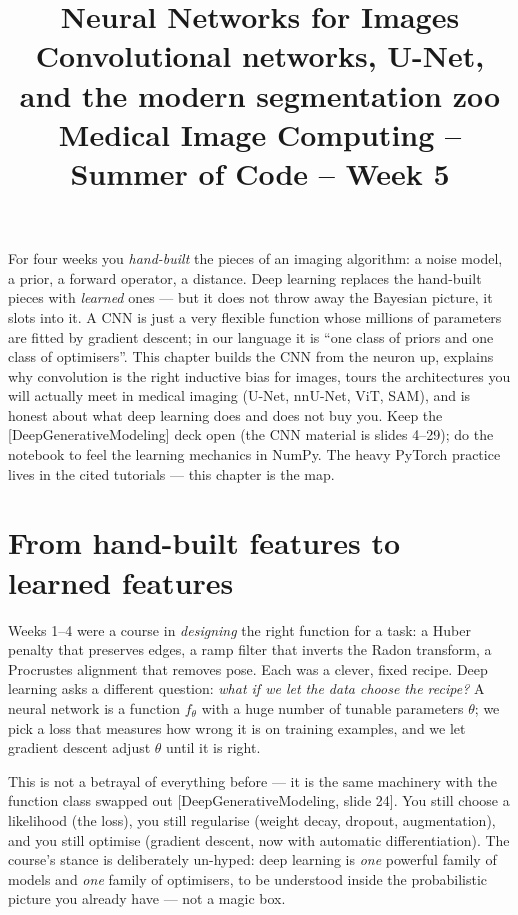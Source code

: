 \documentclass[11pt]{article}
\title{\textbf{Neural Networks for Images}\\[2pt]
\large Convolutional networks, U-Net, and the modern segmentation zoo\\[6pt]
\normalsize Medical Image Computing -- Summer of Code -- Week 5}
\author{}
\date{}
\newcommand{\deck}[1]{\textsf{\small[#1]}}
\begin{document}
\maketitle
\vspace{-2.2em}

\begin{keybox}
For four weeks you \emph{hand-built} the pieces of an imaging algorithm: a noise
model, a prior, a forward operator, a distance. Deep learning replaces the
hand-built pieces with \emph{learned} ones --- but it does not throw away the
Bayesian picture, it slots into it. A CNN is just a very flexible function whose
millions of parameters are fitted by gradient descent; in our language it is
``one class of priors and one class of optimisers''. This chapter builds the CNN
from the neuron up, explains why convolution is the right inductive bias for
images, tours the architectures you will actually meet in medical imaging
(U-Net, nnU-Net, ViT, SAM), and is honest about what deep learning does and does
not buy you. Keep the \deck{DeepGenerativeModeling} deck open (the CNN material
is slides 4--29); do the notebook to feel the learning mechanics in NumPy. The
heavy PyTorch practice lives in the cited tutorials --- this chapter is the map.
\end{keybox}

\tableofcontents
\bigskip

\section{From hand-built features to learned features}

Weeks 1--4 were a course in \emph{designing} the right function for a task: a
Huber penalty that preserves edges, a ramp filter that inverts the Radon
transform, a Procrustes alignment that removes pose. Each was a clever, fixed
recipe. Deep learning asks a different question: \emph{what if we let the data
choose the recipe?} A neural network is a function $f_\theta$ with a huge number
of tunable parameters $\theta$; we pick a loss that measures how wrong it is on
training examples, and we let gradient descent adjust $\theta$ until it is right.

This is not a betrayal of everything before --- it is the same machinery with the
function class swapped out \deck{DeepGenerativeModeling, slide 24}. You still
choose a likelihood (the loss), you still regularise (weight decay, dropout,
augmentation), and you still optimise (gradient descent, now with automatic
differentiation). The course's stance is deliberately un-hyped: deep learning is
\emph{one} powerful family of models and \emph{one} family of optimisers, to be
understood inside the probabilistic picture you already have --- not a magic box.
\end{document}

